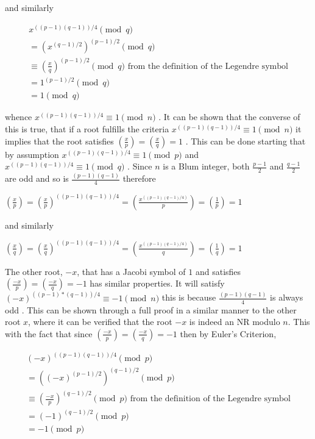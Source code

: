 \documentclass{article}
\begin{document}
and similarly

$$
\begin{array}{l}
    x^{((p-1)(q-1))/4} \pmod{q} \\
    = (x^{(q-1)/2})^{(p-1)/2} \pmod{q} \\
    \equiv \left(\frac{x}{q}\right)^{(p-1)/2} \pmod{q} \mbox{  from the definition of the Legendre symbol} \\
    = 1^{(p-1)/2} \pmod{q}\\
    = 1 \pmod{q}
\end{array}
$$

whence $x^{((p-1)(q-1))/4} \equiv 1 \pmod{n}$ \cite{Mora2013}. It can be shown that the converse of this is true, that if a root fulfills the criteria $x^{((p-1)(q-1))/4} \equiv 1 \pmod{n}$ it implies that the root satisfies $\left(\frac{x}{p}\right) = \left(\frac{x}{q}\right) = 1$ \cite{Mora2013}. This can be done starting that by assumption $x^{((p-1)(q-1))/4} \equiv 1 \pmod{p}$ and $x^{((p-1)(q-1))/4} \equiv 1 \pmod{q}$ \cite{Mora2013}. Since $n$ is a Blum integer, both $\frac{p-1}{2}$ and $\frac{q-1}{2}$ are odd and so is $\frac{(p-1)(q-1)}{4}$ therefore 

$\left(\frac{x}{p}\right) = \left(\frac{x}{p}\right)^{((p-1)(q-1))/4} = \left(\frac{x^{((p-1)(q-1)/4)}}{p}\right) = \left(\frac{1}{p}\right) = 1$

and similarly 

$\left(\frac{x}{q}\right) = \left(\frac{x}{q}\right)^{((p-1)(q-1))/4} = \left(\frac{x^{((p-1)(q-1)/4)}}{q}\right) = \left(\frac{1}{q}\right) = 1$

The other root, $-x$, that has a Jacobi symbol of $1$ and satisfies $\left(\frac{-x}{p}\right) = \left(\frac{-x}{q}\right) = -1$ has similar properties. It will satisfy $(-x)^{((p-1)*(q-1))/4} \equiv -1 \pmod{n}$ this is because $\frac{(p-1)(q-1)}{4}$ is always odd \cite{Mora2013}. This can be shown through a full proof in a similar manner to the other root $x$, where it can be verified that the root $-x$ is indeed an NR modulo $n$. This with the fact that since $\left(\frac{-x}{p}\right) = \left(\frac{-x}{q}\right) = -1$ then by Euler's Criterion,

$$
\begin{array}{l}
    (-x)^{((p-1)(q-1))/4} \pmod{p} \\
    = ((-x)^{(p-1)/2})^{(q-1)/2} \pmod{p} \\
    \equiv \left(\frac{-x}{p}\right)^{(q-1)/2} \pmod{p} \mbox{  from the definition of the Legendre symbol} \\
    = (-1)^{(q-1)/2} \pmod{p}\\
    = -1 \pmod{p}
\end{array}
$$
\end{document}
